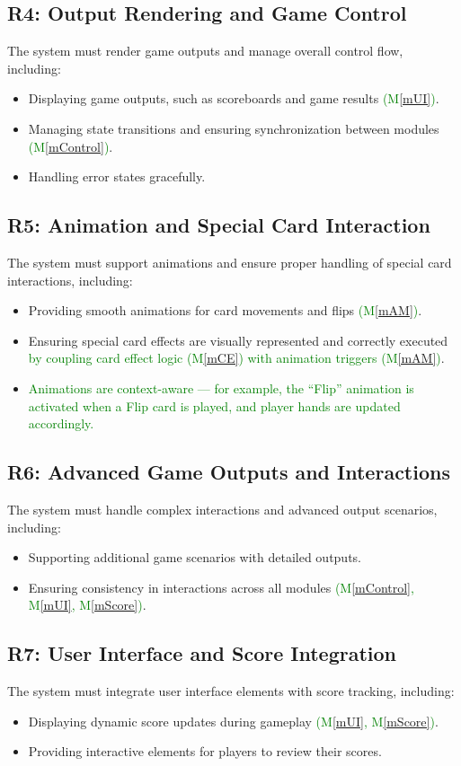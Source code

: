 \documentclass[12pt, titlepage]{article}
\newcommand{\added}[1]{\textcolor{green}{#1}}
\newcommand{\mref}[1]{M\ref{#1}}
\begin{document}
\subsection{R4: Output Rendering and Game Control}
The system must render game outputs and manage overall control flow, including:
\begin{itemize}
    \item Displaying game outputs, such as scoreboards and game results \added{(\mref{mUI})}.
    \item Managing state transitions and ensuring synchronization between modules \added{(\mref{mControl})}.
    \item Handling error states gracefully.
\end{itemize}

\subsection{R5: Animation and Special Card Interaction}
The system must support animations and ensure proper handling of special card interactions, including:
\begin{itemize}
    \item Providing smooth animations for card movements and flips \added{(\mref{mAM})}.
    \item Ensuring special card effects are visually represented and correctly executed \added{by coupling card effect logic (\mref{mCE}) with animation triggers (\mref{mAM})}.
    \item \added{Animations are context-aware — for example, the “Flip” animation is activated when a Flip card is played, and player hands are updated accordingly.}
\end{itemize}

\subsection{R6: Advanced Game Outputs and Interactions}
The system must handle complex interactions and advanced output scenarios, including:
\begin{itemize}
    \item Supporting additional game scenarios with detailed outputs.
    \item Ensuring consistency in interactions across all modules \added{(\mref{mControl}, \mref{mUI}, \mref{mScore})}.
\end{itemize}

\subsection{R7: User Interface and Score Integration}
The system must integrate user interface elements with score tracking, including:
\begin{itemize}
    \item Displaying dynamic score updates during gameplay \added{(\mref{mUI}, \mref{mScore})}.
    \item Providing interactive elements for players to review their scores.
\end{itemize}
\end{document}
